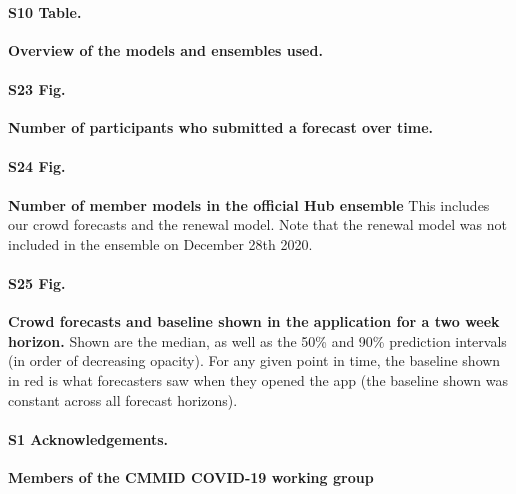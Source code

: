 \documentclass[10pt,letterpaper]{article}
\begin{document}
\paragraph{S10 Table.}
\label{tab:table-ensemble-versions}

\textbf{Overview of the models and ensembles used.}

\paragraph{S23 Fig.}
\label{fig:num-forecasters}

\textbf{Number of participants who submitted a forecast over time.}

\paragraph{S24 Fig.}
\label{fig:num-ensemble-members}

\textbf{Number of member models in the official Hub ensemble} This
includes our crowd forecasts and the renewal model. Note that the
renewal model was not included in the ensemble on December 28th 2020.

\paragraph{S25 Fig.}
\label{fig:compare-forecasters}

\textbf{Crowd forecasts and baseline shown in the application for a two week horizon.}
Shown are the median, as well as the 50\% and 90\% prediction intervals
(in order of decreasing opacity). For any given point in time, the
baseline shown in red is what forecasters saw when they opened the app
(the baseline shown was constant across all forecast horizons).

\paragraph*{S1 Acknowledgements.}

\textbf{Members of the CMMID COVID-19 working group}

\nolinenumbers
\end{document}
